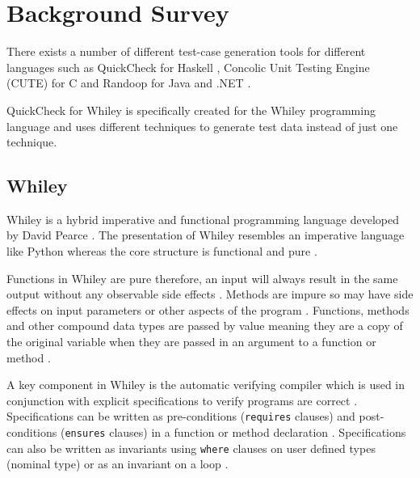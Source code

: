 \section{Background Survey}\label{section:background}


There exists a number of different test-case generation tools for different languages such as QuickCheck for Haskell \cite{QClightweight}, Concolic Unit Testing Engine (CUTE) for C \cite{CUTE} and Randoop for Java \cite{randoopJava} and .NET \cite{randoopAll}.


QuickCheck for Whiley is specifically created for the Whiley programming language and uses different techniques to generate test data instead of just one technique.

\subsection{Whiley}
Whiley is a hybrid imperative and functional programming language developed by David Pearce \cite{WhileyPlatform}. The presentation of Whiley resembles an imperative language like Python whereas the core structure is functional and pure \cite{WhileyPlatform}. 

Functions in Whiley are pure therefore, an input will always result in the same output without any observable side effects \cite{WhileyLang}.
Methods are impure so may have side effects on input parameters or other aspects of the program \cite{WhileyLang}. 
Functions, methods and other compound data types are passed by value meaning they are a copy of the original variable when they are passed in an argument to a function or method \cite{WhileyPlatform}.


A key component in Whiley is the automatic verifying compiler
which is used in conjunction with explicit specifications to verify programs are correct \cite{WhileyPlatform}.
Specifications can be written as pre-conditions (\texttt{requires} clauses) and post-conditions (\texttt{ensures} clauses) in a function or method declaration \cite{WhileyPlatform}.
Specifications can also be written as invariants using \texttt{where} clauses on user defined types (nominal type) or as an invariant on a loop \cite{WhileyPlatform}. 

